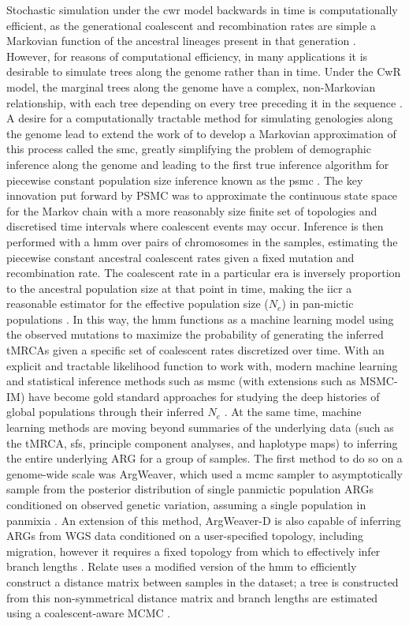 Stochastic simulation under the \gls{cwr} model backwards in time is computationally efficient, as the generational coalescent and recombination rates are simple a Markovian function of the ancestral lineages present in that generation \cite{RR1983}. However, for reasons of computational efficiency, in many applications it is desirable to simulate trees along the genome rather than in time. Under the CwR model, the marginal trees along the genome have a complex, non-Markovian relationship, with each tree depending on every tree preceding it in the sequence \cite{C1999}. A desire for a computationally tractable method for simulating genologies along the genome lead \textcite{McVean2005a} to extend the work of \textcite{C1999} to develop a Markovian approximation of this process called the \gls{smc}, greatly simplifying the problem of demographic inference along the genome and leading to the first true inference algorithm for piecewise constant population size inference known as the \gls{psmc} \cite{Li2011a}. The key innovation put forward by PSMC was to approximate the continuous state space for the Markov chain with a more reasonably size finite set of topologies and discretised time intervals where coalescent events may occur. Inference is then performed with a \gls{hmm} over pairs of chromosomes in the samples, estimating the piecewise constant ancestral coalescent rates given a fixed mutation and recombination rate. The coalescent rate in a particular era is inversely proportion to the ancestral population size at that point in time, making the \gls{iicr} a reasonable estimator for the effective population size ($N_e$) in pan-mictic populations \cite{Chikhi2018}. In this way, the \gls{hmm} functions as a machine learning model using the observed mutations to maximize the probability of generating the inferred tMRCAs given a specific set of coalescent rates discretized over time. With an explicit and tractable likelihood function to work with, modern machine learning and statistical inference methods such as \gls{msmc} (with extensions such as MSMC-IM) have become gold standard approaches for studying the deep histories of global populations through their inferred $N_e$ \cite{Wang2020,Fan2019b,Schiffels2014c}. At the same time, machine learning methods are moving beyond summaries of the underlying data (such as the tMRCA, \gls{sfs}, principle component analyses, and haplotype maps) to inferring the entire underlying ARG for a group of samples. The first method to do so on a genome-wide scale was ArgWeaver, which used a \gls{mcmc} sampler to asymptotically sample from the posterior distribution of single panmictic population ARGs conditioned on observed genetic variation, assuming a single population in panmixia \cite{Rasmussen2014a}. An extension of this method, ArgWeaver-D is also capable of inferring ARGs from WGS data conditioned on a user-specified topology, including migration, however it requires a fixed topology from which to effectively infer branch lengths \cite{Hubisz2020}. Relate uses a modified version of the \textcite{N2003} \gls{hmm} to efficiently construct a distance matrix between samples in the dataset; a tree is constructed from this non-symmetrical distance matrix and branch lengths are estimated using a coalescent-aware MCMC \cite{Speidel2019a}. 